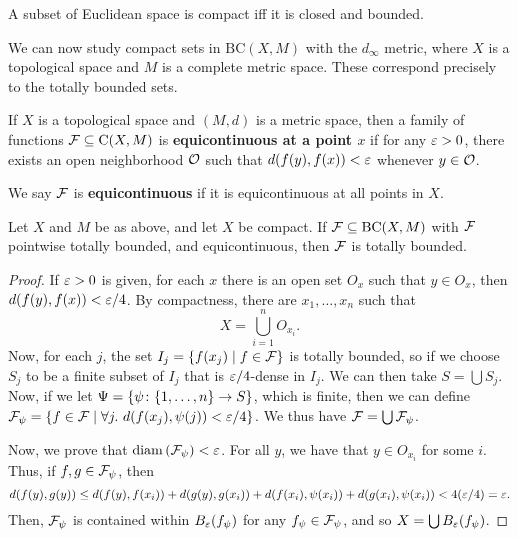 \begin{corollary}
    A subset of Euclidean space is compact iff it is closed and bounded.
\end{corollary}

We can now study compact sets in $\mathrm{BC}(X, M)$ with the $d_\infty$ metric, where $X$ is a topological space and $M$ is a complete metric space. These correspond precisely to the totally bounded sets.

\begin{definition}
    If $X$ is a topological space and $(M, d)$ is a metric space, then a family of functions $\mathcal F \subseteq \mathrm C(X, M)$ is \textbf{equicontinuous at a point $x$} if for any $\varepsilon > 0$, there exists an open neighborhood $\mathcal O$ such that $d(f(y), f(x)) < \varepsilon$ whenever $y \in \mathcal O$.

    We say $\mathcal F$ is \textbf{equicontinuous} if it is equicontinuous at all points in $X$.
\end{definition}

\begin{theorem}
    Let $X$ and $M$ be as above, and let $X$ be compact. If $\mathcal F \subseteq \mathrm{BC}(X, M)$ with $\mathcal F$ pointwise totally bounded, and equicontinuous, then $\mathcal F$ is totally bounded.
\end{theorem}

\begin{proof}
    If $\varepsilon > 0$ is given, for each $x$ there is an open set $O_x$ such that $y \in O_x$, then $d(f(y), f(x)) < \varepsilon/4$. By compactness, there are $x_1, \dots, x_n$ such that \[X = \bigcup_{i = 1}^n O_{x_i}.\] Now, for each $j$, the set $I_j = \qty{f(x_j) \mid f \in \mathcal F}$ is totally bounded, so if we choose $S_j$ to be a finite subset of $I_j$ that is $\varepsilon/4$-dense in $I_j$. We can then take $S = \bigcup S_j$. Now, if we let $\Psi= \qty{\psi \colon \qty{1, \dots, n} \to S}$, which is finite, then we can define $\mc F_\psi = \qty{f \in \mc F \mid \forall j.\ d\qty(f\qty(x_j), \psi(j)) < \veps/4}$. We thus have $\mathcal F = \bigcup \mathcal F_{\psi}$.

    Now, we prove that $\operatorname{diam}\qty(\mathcal F_\psi) < \varepsilon$. For all $y$, we have that $y \in O_{x_i}$ for some $i$. Thus, if $f, g \in \mathcal F_\psi$, then \[d(f(y), g(y)) \le d(f(y), f(x_i)) + d(g(y), g(x_i)) + d(f(x_i), \psi(x_i)) + d(g(x_i), \psi(x_i)) < 4(\varepsilon/4) = \varepsilon.\] Then, $\mathcal F_\psi$ is contained within $B_\varepsilon(f_\psi)$ for any $f_\psi \in \mathcal F_\psi$, and so $X = \bigcup B_\varepsilon(f_\psi)$.
\end{proof}

